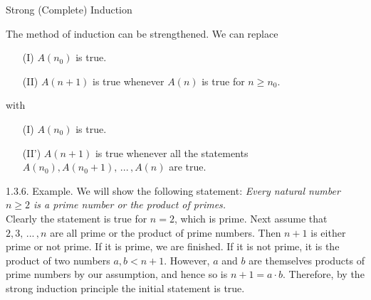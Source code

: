 \documentclass[smaller,hyperref={CJKbookmarks=true}]{beamer}
\begin{document}
\begin{frame}[t]{Strong (Complete) Induction}
\begin{spacing}{0.95}
The method of induction can be strengthened. We can replace
\begin{itemize}
  \item[(I)] $A(n_0)$ is true.
  \item[(II)] $A(n+1)$ is true whenever $A(n)$ is true for $n\geq n_0$.
\end{itemize}
with
\begin{itemize}
  \item[(I)] $A(n_0)$ is true.
  \item[(II')] $A(n+1)$ is true whenever all the statements\\
      $A(n_0),A(n_0+1),\,...\,,A(n)$ are true.
\end{itemize}
\alert{1.3.6. Example.} We will show the following statement: \emph{Every natural number $n\geq2$ is a prime number or the product of primes.}\\[3pt]
Clearly the statement is true for $n=2$, which is prime. Next assume that $2,3,\,...\,,n$ are all prime or the product of prime numbers. Then $n+1$ is either prime or not prime. If it is prime, we are finished. If it is not prime, it is the product of two numbers $a,b<n+1$. However, $a$ and $b$ are themselves products of prime numbers by our assumption, and hence so is $n+1=a\cdot b$. Therefore, by the strong induction principle the initial statement is true.
\end{spacing}
\end{frame}
\end{document}
